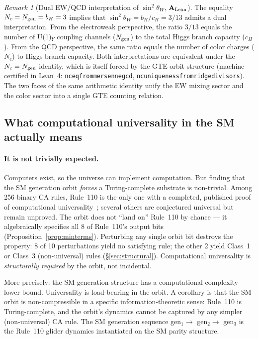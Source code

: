 \documentclass[11pt]{article}
\theoremstyle{remark}
\newtheorem{remark}[theorem]{Remark}
\newcommand{\lean}[1]{%
  \penalty-100
  \begingroup\def\_{\textunderscore\allowbreak}\texttt{#1}\endgroup}
\newcommand{\CatAL}{\ensuremath{\textbf{A}_{\rm Lean}}}
\begin{document}
\begin{remark}[Dual EW/QCD interpretation of $\sin^2\!\theta_W$, $\CatAL$]
\label{rem:sin2_dual}
The equality $N_c = N_{\rm gen} = b_H = 3$ implies that
$\sin^2\!\theta_W = b_H/c_H = 3/13$ admits a dual interpretation.
From the electroweak perspective, the ratio $3/13$ equals the number of U(1)$_Y$
coupling channels ($N_{\rm gen}$) to the total Higgs branch capacity ($c_H$).
From the QCD perspective, the same ratio equals the number of color charges ($N_c$)
to Higgs branch capacity.
Both interpretations are equivalent under the $N_c = N_{\rm gen}$ identity, which is
itself forced by the GTE orbit structure (machine-certified in Lean~4:
\lean{nc\_eq\_3\_from\_mersenne\_gcd}, \lean{nc\_uniqueness\_from\_ridge\_divisors}).
The two faces of the same arithmetic identity unify the EW mixing sector and the
color sector into a single GTE counting relation.
\end{remark}

\subsection{What computational universality in the SM actually means}

\paragraph{It is not trivially expected.}
Computers exist, so the universe can implement computation. But finding that the SM
generation orbit \emph{forces} a Turing-complete substrate is non-trivial. Among 256
binary CA rules, Rule~110 is the only one with a completed, published proof of
computational universality~\cite{Cook2004,Cook2009}; several others are conjectured universal
but remain unproved. The orbit does not ``land on'' Rule~110 by chance --- it algebraically
specifies all 8 of Rule~110's output bits
(Proposition~\ref{prop:minterms}). Perturbing any single orbit bit destroys the property:
8 of 10 perturbations yield no satisfying rule; the other 2 yield Class~1 or Class~3
(non-universal) rules (\S\ref{sec:structural}). Computational universality is
\emph{structurally required} by the orbit, not incidental.

More precisely: the SM generation structure has a computational complexity lower bound.
Universality is load-bearing in the orbit. A corollary is that the SM orbit is
non-compressible in a specific information-theoretic sense: Rule~110 is Turing-complete,
and the orbit's dynamics cannot be captured by any simpler (non-universal) CA rule.
The SM generation sequence gen$_1 \to$ gen$_2 \to$ gen$_3$ is the Rule~110 glider
dynamics instantiated on the SM parity structure.
\end{document}
